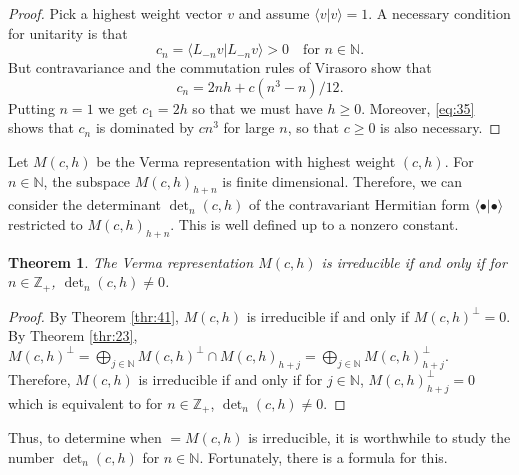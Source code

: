 \documentclass[a4paper, 12pt, reqno]{amsart}
\newtheorem{theorem}{Theorem}[subsection]
\theoremstyle{remark}
\numberwithin{equation}{subsection}
\begin{document}
\begin{proof}
  Pick a highest weight vector $v$ and assume $\langle v| v\rangle=1$.
  A necessary condition for unitarity is that
  \begin{equation*}
    c_n = \langle L_{-n}v| L_{-n}v\rangle > 0 \quad \text{for } n \in \mathbb{N}.
  \end{equation*}
  But contravariance and the commutation rules of Virasoro show that
  \begin{equation}
    \label{eq:35}
    c_n = 2nh + c(n^3 - n)/12.
  \end{equation}
  Putting $n = 1$ we get $c_1 = 2h$ so that we must have $h \ge 0$.
  Moreover, \eqref{eq:35} shows that $c_n$ is dominated by $cn^3$ for large $n$, so that $c \ge 0$ is also necessary.
\end{proof}

Let $M(c, h)$ be the Verma representation with highest weight $(c, h)$.
For $n \in \mathbb{N}$, the subspace $M(c, h)_{h + n}$ is finite dimensional.
Therefore, we can consider the determinant $\det_n(c, h)$ of the contravariant Hermitian form $\langle \bullet| \bullet\rangle$ restricted to $M(c, h)_{h + n}$.
This is well defined up to a nonzero constant.

\begin{theorem}
  \label{thr:43}
  The Verma representation $M(c, h)$ is irreducible if and only if for $n \in \mathbb{Z}_+$, $\det_n(c, h) \neq 0$.
\end{theorem}

\begin{proof}
  By Theorem \ref{thr:41}, $M(c, h)$ is irreducible if and only if $M(c, h)^{\perp} = 0$.
  By Theorem \ref{thr:23}, $M(c, h)^{\perp} = \bigoplus_{j \in \mathbb{N}}M(c, h)^{\perp} \cap M(c, h)_{h + j} = \bigoplus_{j \in \mathbb{N}}M(c, h)_{h + j}^{\perp}$.
  Therefore, $M(c, h)$ is irreducible if and only if for $j \in \mathbb{N}$, $M(c, h)_{h + j}^{\perp} = 0$ which is equivalent to for $n \in \mathbb{Z}_+$, $\det_n(c, h) \neq 0$.
\end{proof}

Thus, to determine when $=M(c, h)$ is irreducible, it is worthwhile to study the number $\det_n(c, h)$ for $n \in \mathbb{N}$.
Fortunately, there is a formula for this.
\end{document}
